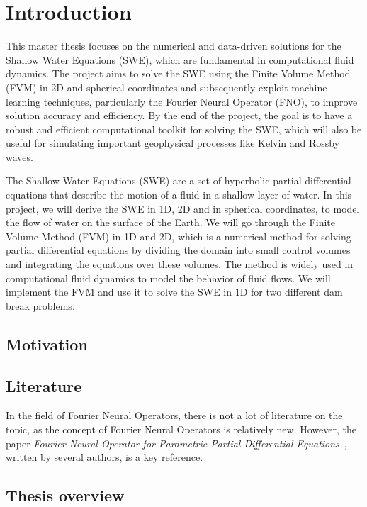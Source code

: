 \chapter{Introduction}

This master thesis focuses on the numerical and data-driven solutions for the Shallow Water Equations (SWE), which are fundamental in computational fluid dynamics.
The project aims to solve the SWE using the Finite Volume Method (FVM) in 2D and spherical coordinates and subsequently exploit machine learning techniques, particularly the Fourier Neural Operator (FNO), to improve solution accuracy and efficiency.
By the end of the project, the goal is to have a robust and efficient computational toolkit for solving the SWE, which will also be useful for simulating important geophysical processes like Kelvin and Rossby waves. 

The Shallow Water Equations (SWE) are a set of hyperbolic partial differential equations that describe the motion of a fluid in a shallow layer of water.
In this project, we will derive the SWE in 1D, 2D and in spherical coordinates, to model the flow of water on the surface of the Earth.
We will go through the Finite Volume Method (FVM) in 1D and 2D, which is a numerical method for solving partial differential equations by dividing the domain into small control volumes and integrating the equations over these volumes.
The method is widely used in computational fluid dynamics to model the behavior of fluid flows.
We will implement the FVM and use it to solve the SWE in 1D for two different dam break problems. 


\section{Motivation}

\section{Literature}

In the field of Fourier Neural Operators, there is not a lot of literature on the topic, as the concept of Fourier Neural Operators is relatively new.
However, the paper \textit{Fourier Neural Operator for Parametric Partial Differential Equations}~\cite{FNO_2021}, written by several authors, is a key reference.

\section{Thesis overview}




